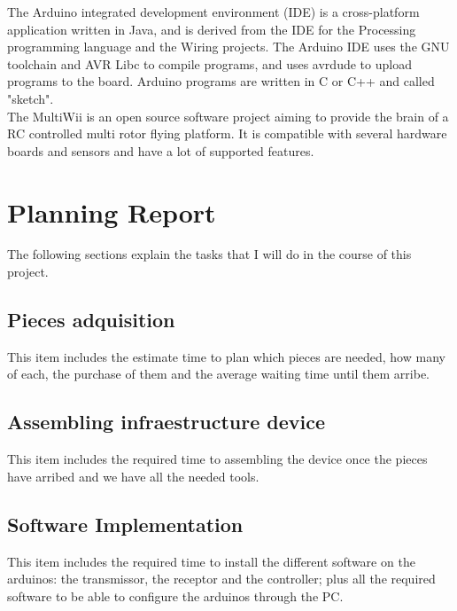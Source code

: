 \documentclass[12pt, a4paper,twoside]{tesi_upf}
\begin{document}
The Arduino integrated development environment (IDE) is a cross-platform application written in Java, and is derived from the IDE for the Processing programming language and the Wiring projects. The Arduino IDE uses the GNU toolchain and AVR Libc to compile programs, and uses avrdude to upload programs to the board. Arduino programs are written in C or C++ and called "sketch". 
\\[12pt]

The MultiWii is an open source software project aiming to provide the brain of a RC controlled multi rotor flying platform. It is compatible with several hardware boards and sensors and have a lot of supported features.
\\[12pt]





\chapter{Planning Report}

The following sections explain the tasks that I will do in the course of this project.

\section{Pieces adquisition}

This item includes the estimate time to plan which pieces are needed, how many of each, the purchase of them and the average waiting time until them arribe. 

\section{Assembling infraestructure device}

This item includes the required time to assembling the device once the pieces have arribed and we have all the needed tools.

\section{Software Implementation}

This item includes the required time to install the different software on the arduinos: the transmissor, the receptor and the controller; plus all the required software to be able to configure the arduinos through the PC.
\end{document}
